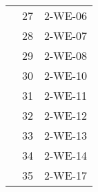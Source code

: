 \begin{table}[h]
\begin{tabular}{L{3cm}C{2cm}C{3cm}}
 & 27 & 2-WE-06 \\
 & 28 & 2-WE-07 \\
 & 29 & 2-WE-08 \\
 & 30 & 2-WE-10 \\
 & 31 & 2-WE-11 \\
 & 32 & 2-WE-12 \\
 & 33 & 2-WE-13 \\
 & 34 & 2-WE-14 \\
 & 35 & 2-WE-17 \\
  \bottomrule
\end{tabular}
\end{table}

